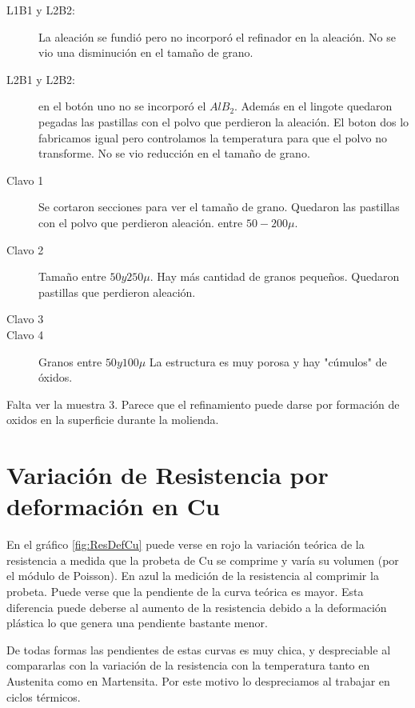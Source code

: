 \documentclass[a4paper,12pt,fleqn,twoside,openany]{book}
\begin{document}
\begin{description}
 \item[L1B1 y L2B2:] La aleación se fundió pero no incorporó el refinador en la aleación. No se vio una disminución en el tamaño de grano.
 \item[L2B1 y L2B2:] en el botón uno no se incorporó el $AlB_2$. Además en el lingote quedaron pegadas las pastillas con el polvo que perdieron la aleación. El boton dos lo fabricamos igual pero controlamos la temperatura para que el polvo no transforme. No se vio reducción en el tamaño de grano. \item[Clavo 1] Se cortaron secciones para ver el tamaño de grano. Quedaron las pastillas con el polvo que perdieron aleación. entre $50-200 \mu$.
 \item[Clavo 2] Tamaño entre $50 y 250 \mu$. Hay más cantidad de granos pequeños. Quedaron pastillas que perdieron aleación. 
 \item[Clavo 3]
 \item[Clavo 4] Granos entre $50 y 100 \mu$ La estructura es muy porosa y hay "cúmulos" de óxidos.  
 \end{description}

 Falta ver la muestra 3. Parece que el refinamiento puede darse por formación de oxidos en la superficie durante la molienda.

\section{Variación de Resistencia por deformación en Cu}

En el gráfico \ref{fig:ResDefCu} puede verse en rojo la variación teórica de la resistencia a medida que la probeta de Cu se comprime y varía su volumen (por el módulo de Poisson).
En azul la medición de la resistencia al comprimir la probeta. Puede verse que la pendiente de la curva teórica es mayor. Esta diferencia puede deberse 
al aumento de la resistencia debido a la deformación plástica lo que genera una pendiente bastante menor.

De todas formas las pendientes de estas curvas es muy chica, y despreciable al compararlas con la variación de la resistencia con la temperatura tanto en Austenita 
como en Martensita. Por este motivo lo despreciamos al trabajar en ciclos térmicos.
\end{document}
